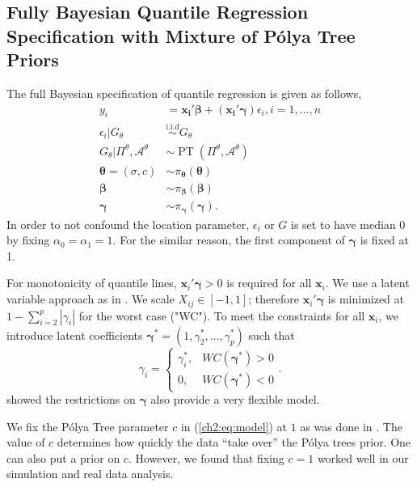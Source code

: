 \documentclass[12pt]{article}
\newcommand{\polya}{P\'{o}lya}
\newcommand{\iid}{\stackrel{\mbox{i.i.d}}{\sim}}
\DeclareMathOperator{\pt}{PT}
\begin{document}
\subsection{Fully Bayesian Quantile Regression Specification with
  Mixture of \polya{} Tree Priors}\label{ch2:sec:bayesmodel}
The full Bayesian specification of quantile regression is given as
follows,
\begin{equation}\label{ch2:eq:model}
\begin{aligned}
  y_i& = \bm{x_i\prime\beta} + (\bm{x_i\prime\gamma}) \epsilon_{i}, i = 1,
  \ldots,
  n \\
  \epsilon_i |G_{\theta} & \iid G_{\theta} \\
  G_{\theta}|\Pi^{\theta}, \mathcal{A}^{\theta} & \sim \pt
  (\Pi^{\theta}, \mathcal{A}^{\theta}) \\
  \bm{\theta} = (\sigma, c) & \sim \pi_{\bm \theta}(\bm \theta) \\
  \bm{\beta} & \sim \pi_{\bm \beta}(\bm \beta)\\
  \bm{\gamma} &\sim \pi_{\bm \gamma}(\bm \gamma).
\end{aligned}
\end{equation}
In order to not confound the location parameter, $\epsilon_i $ or $G$
is set to have median 0 by fixing $\alpha_0=\alpha_1 = 1$. For the
similar reason, the first component of $\bm{\gamma}$ is fixed at 1.

For monotonicity of quantile lines, $\bm x_i\prime \bm \gamma > 0$ is required for all $\bm x_i$.
We use a latent variable approach as in \citet{reich2011}.
We scale $X_{ij} \in [-1, 1]$; therefore $\bm x_i\prime \bm \gamma$ is minimized at $1 - \sum_{i = 2}^{p} |\gamma_i|$ for the worst case ("WC").
To meet the constraints for all $\bm x_i$, we introduce latent coefficients $\bm \gamma^{*} = (1, \gamma_2^{*}, \ldots, \gamma_p^{*})$ such that
\begin{displaymath}
\gamma_i =
\begin{cases}
\gamma_i^{*}, & WC(\bm \gamma^{*}) > 0 \\
0,            & WC(\bm \gamma^{*} ) < 0
\end{cases}.
\end{displaymath}
\citet{reich2013} showed the restrictions on $\bm \gamma$ also provide a very flexible model.

We fix the \polya{} Tree parameter $c$ in (\ref{ch2:eq:model}) at $1$ as was done in \citet{hanson2006}.
The value of $c$ determines how quickly the data ``take over'' the \polya{} trees prior.
One can also put a prior on $c$.
However, we found that fixing $c = 1$ worked well in our simulation and real data analysis.
\end{document}
